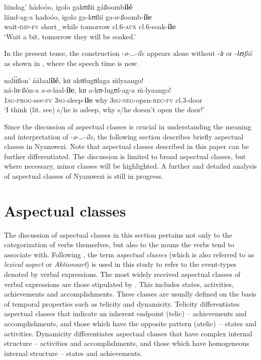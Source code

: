 \documentclass[output=paper,newtxmath,modfonts,nonflat,draftmode]{langsci/langscibook}
\begin{document}
\ea \label{ex:kanijo:6}
\glll liindag’        hádoóo,      igolo         gakʊßii   gáßoomb\textbf{ílé}\\
liind-ag-a     hadoóo,      igolo         ga-kʊßií  ga-ø-ßoomb-\textbf{íle}\\
wait-\textsc{imp}-\textsc{fv} short\_while tomorrow cl.\textsc{6-aux} cl.6-soak-\textbf{íle}\\
\glt ‘Wait a bit, tomorrow they will be soaked.’
\z


In the present tense, the construction -\textit{ø}-\ldots-\textit{íle} appears alone without -\textit{l}{\textit{ɪ}} or -\textit{kʊßií} as shown in , where the speech time is now. 

\ea \label{ex:kanijo:7}
\glll nalɪ́ɪ́ßon’           áálaal\textbf{ílé},    k{ɪɪ} akʊlugʊlaga              \`{m}lyaango!\\
ná-lɪɪ-ßón-a           a-ø-laal-\textbf{íle},   kɪɪ  a-kʊ-lugʊl-ag-a            \`{m}-lyaango!\\
\textsc{1sg}-\textsc{prog}-see-\textsc{fv} \textsc{3sg}-sleep-\textbf{ile} why \textsc{3sg}-\textsc{neg}-open-\textsc{rec}-\textsc{fv} cl.3-door\\
\glt ‘I think (lit. see) s/he is asleep, why s/he doesn't open the door!’
\z

Since the discussion of aspectual classes is crucial in understanding the meaning and interpretation of -\textit{ø}-…-\textit{íle}, the following section describes briefly aspectual classes in Nyamwezi. Note that aspectual classes described in this paper can be further differentiated. The discussion is limited to broad aspectual classes, but where necessary, minor classes will be highlighted. A further and detailed analysis of aspectual classes of Nyamwezi is still in progress. 


\section{Aspectual classes}
\label{sec:kanijo:3}

The discussion of aspectual classes in this section pertains not only to the categorization of verbs themselves, but also to the nouns the verbs tend to associate with. Following \citet[1]{Rothstein2004}, the term \textit{aspectual} \textit{classes} (which is also referred to as \textit{lexical} \textit{aspect} or \textit{Aktionsart}) is used in this study to refer to the event-types denoted by verbal expressions. The most widely received aspectual classes of verbal expressions are those stipulated by \citet{Vendler1957}. This includes states, activities, achievements and accomplishments. These classes are usually defined on the basis of temporal properties such as telicity and dynamicity. Telicity differentiates aspectual classes that indicate an inherent endpoint (telic) -- achievements and accomplishments, and those which have the opposite pattern (atelic)~-- states and activities. Dynamicity differentiates aspectual classes that have complex internal structure -- activities and accomplishments, and those which have homogeneous internal structure -- states and achievements.
\end{document}
